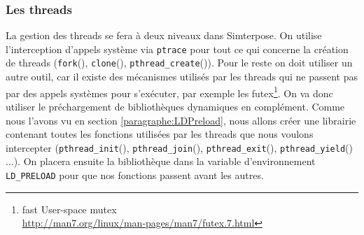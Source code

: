 \subsubsection{Les threads}

La gestion des threads se fera à deux niveaux dans Simterpose. On utilise l'interception d'appels système via \texttt{ptrace} pour tout ce qui concerne la création de threads (\texttt{fork}(), \texttt{clone}(), \texttt{pthread\_create}()). Pour le reste on doit utiliser un autre outil, car il existe des mécanismes utilisés par les threads qui ne passent pas par des appels systèmes pour s'exécuter, par exemple les futex\footnote{fast User-space mutex \\ \url{http://man7.org/linux/man-pages/man7/futex.7.html}}. On va donc utiliser le préchargement de bibliothèques dynamiques en complément. Comme nous l'avons vu en section \ref{paragraphe:LDPreload}, nous allons créer une librairie contenant toutes les fonctions utilisées par les threads que nous voulons intercepter (\texttt{pthread\_init}(), \texttt{pthread\_join}(), \texttt{pthread\_exit}(), \texttt{pthread\_yield}() ...). On placera ensuite la bibliothèque dans la variable d'environnement \texttt{LD\_PRELOAD} pour que nos fonctions passent avant les autres.


